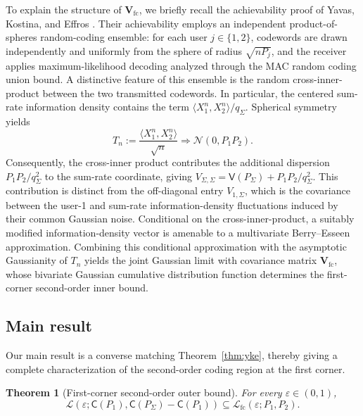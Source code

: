 \documentclass[11pt,onecolumn]{IEEEtran}
\newcommand{\calL}{\mathcal{L}}
\newcommand{\calN}{\mathcal{N}}
\newcommand{\bV}{\mathbf{V}}
\newcommand{\rvC}{\mathsf{C}}
\newcommand{\rvV}{\mathsf{V}}
\newcommand{\eps}{\varepsilon}
\newtheorem{theorem}{Theorem}
\begin{document}
To explain the structure of $\bV_{\mathrm{fc}}$, we briefly recall the
achievability proof of Yavas, Kostina, and Effros \cite{yavas21}. Their  achievability employs an independent
product-of-spheres random-coding ensemble: for each user $j \in \{1,2\}$, codewords are
drawn independently and uniformly from the sphere of radius $\sqrt{nP_j}$,
and the receiver applies maximum-likelihood decoding analyzed through the MAC
random coding union bound. A distinctive feature of this ensemble is the
random cross-inner-product between the two transmitted codewords. In
particular, the centered sum-rate information density contains the term
$\langle X_1^n,X_2^n\rangle/q_\Sigma$. Spherical symmetry yields
\begin{equation}
 T_n:=\frac{\langle X_1^n,X_2^n\rangle}{\sqrt n}
 \Rightarrow \calN(0,P_1P_2). \label{eqn:Tn}
\end{equation}
Consequently, the cross-inner product contributes the additional dispersion
${P_1P_2}/{q_\Sigma^2}$
to the sum-rate coordinate, giving
$
 V_{\Sigma,\Sigma}
 =\rvV(P_\Sigma)+{P_1P_2}/{q_\Sigma^2}.
$
This contribution is distinct from the off-diagonal entry
$V_{1,\Sigma}$, which is the covariance between the user-1 and sum-rate information-density
fluctuations induced by their common Gaussian noise. Conditional on the
cross-inner-product, a suitably modified information-density vector is
amenable to a multivariate Berry--Esseen approximation. Combining this
conditional approximation with the asymptotic Gaussianity of $T_n$ yields
the joint Gaussian limit with covariance matrix $\bV_{\mathrm{fc}}$, whose
bivariate Gaussian cumulative distribution function determines the
first-corner second-order inner bound.

\subsection{Main result}
Our main result is a converse matching
Theorem~\ref{thm:yke}, thereby giving a complete
characterization of the second-order coding region at the first corner.

\begin{theorem}[First-corner second-order outer bound]\label{thm:second-order_outer}
For every $\eps\in(0,1)$, %
\begin{equation}
\calL(\eps; \rvC(P_1),  \rvC(P_\Sigma)-\rvC(P_1))\subseteq \calL_{\mathrm{fc}}(\eps;P_1, P_2). \label{eqn:outer_bd}
\end{equation}
\end{theorem}
\end{document}
